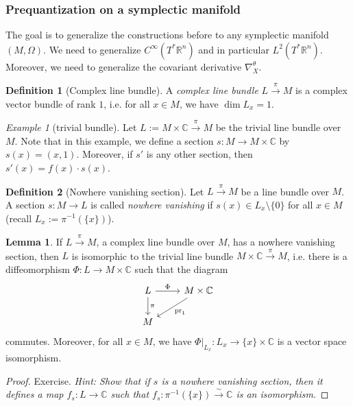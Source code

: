 \documentclass[12pt]{amsart}
\numberwithin{equation}{section}
\theoremstyle{plain}
\theoremstyle{definition}
\newtheorem{defn}{Definition}[subsection]
\newtheorem{lem}{Lemma}[subsection]
\theoremstyle{remark}
\newtheorem{ex}{Example}[subsection]
\newcommand{\R}{\mathbb{R}}
\begin{document}
\subsubsection{Prequantization on a symplectic manifold}
The goal is to generalize the constructions before to any symplectic manifold $(M,\Omega)$. We need to generalize $C^\infty(T^*\R^n)$ and in particular $L^2(T^*\R^n)$. Moreover, we need to generalize the covariant derivative $\nabla^\theta_X$. 

\begin{defn}[Complex line bundle]
A \emph{complex line bundle} $L\xrightarrow{\pi}M$ is a complex vector bundle of rank $1$, i.e. for all $x\in M$, we have $\dim L_x=1$. 
\end{defn}

\begin{ex}[trivial bundle]
Let $L:=M\times\mathbb{C}\xrightarrow{\pi}M$ be the trivial line bundle over $M$. Note that in this example, we define a section $s\colon M\to M\times \mathbb{C}$ by $s(x)=(x,1)$. Moreover, if $s'$ is any other section, then $s'(x)=f(x)\cdot s(x)$. 
\end{ex}


\begin{defn}[Nowhere vanishing section]
Let $L\xrightarrow{\pi}M$ be a line bundle over $M$. A section $s\colon M\to L$ is called \emph{nowhere vanishing} if $s(x)\in L_x\setminus\{0\}$ for all $x\in M$ (recall $L_x:=\pi^{-1}(\{x\})$).
\end{defn}

\begin{lem}
If $L\xrightarrow{\pi} M$, a complex line bundle over $M$, has a nowhere vanishing section, then $L$ is isomorphic to the trivial line bundle $M\times\mathbb{C}\xrightarrow{\pi}M$, i.e. there is a diffeomorphism $\Phi\colon L\to M\times\mathbb{C}$ such that the diagram 
\[
\begin{tikzcd}
L\arrow[d,"\pi"]\arrow[r,"\Phi"]&M\times \mathbb{C}\arrow[dl,"\mathrm{pr}_1"]\\
M&
\end{tikzcd}
\]
commutes. Moreover, for all $x\in M$, we have $\Phi\big|_{L_x}\colon L_x\to \{x\}\times\mathbb{C}$ is a vector space isomorphism.
\end{lem}
\begin{proof}
Exercise. \emph{Hint: Show that if $s$ is a nowhere vanishing section, then it defines a map $f_s\colon L\to \mathbb{C}$ such that $f_s\colon \pi^{-1}(\{x\})\xrightarrow{\sim} \mathbb{C}$ is an isomorphism}.
\end{proof}
\end{document}

